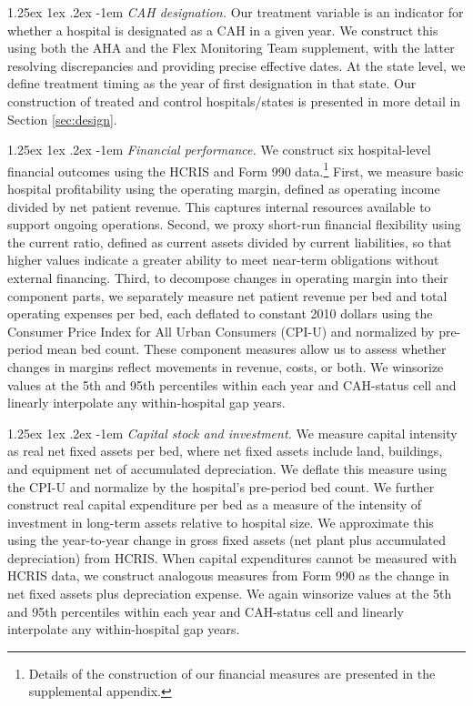 \documentclass[a4paper, 12pt, twoside]{article}
\makeatletter
\renewcommand\paragraph{\@startsection{paragraph}{4}{\z@}%
   {1.25ex \@plus 1ex \@minus .2ex}%
   {-1em}%
   {\normalfont\itshape}}
\makeatother
\begin{document}
\paragraph{\textit{CAH designation.}}  
Our treatment variable is an indicator for whether a hospital is designated as a CAH in a given year. We construct this using both the AHA and the Flex Monitoring Team supplement, with the latter resolving discrepancies and providing precise effective dates. At the state level, we define treatment timing as the year of first designation in that state. Our construction of treated and control hospitals/states is presented in more detail in Section \ref{sec:design}.

\paragraph{\textit{Financial performance.}}
We construct six hospital-level financial outcomes using the HCRIS and Form 990 data.\footnote{Details of the construction of our financial measures are presented in the supplemental appendix.} First, we measure basic hospital profitability using the operating margin, defined as operating income divided by net patient revenue. This captures internal resources available to support ongoing operations. Second, we proxy short-run financial flexibility using the current ratio, defined as current assets divided by current liabilities, so that higher values indicate a greater ability to meet near-term obligations without external financing. Third, to decompose changes in operating margin into their component parts, we separately measure net patient revenue per bed and total operating expenses per bed, each deflated to constant 2010 dollars using the Consumer Price Index for All Urban Consumers (CPI-U) and normalized by pre-period mean bed count. These component measures allow us to assess whether changes in margins reflect movements in revenue, costs, or both. We winsorize values at the 5th and 95th percentiles within each year and CAH-status cell and linearly interpolate any within-hospital gap years.

\paragraph{\textit{Capital stock and investment.}}
We measure capital intensity as real net fixed assets per bed, where net fixed assets include land, buildings, and equipment net of accumulated depreciation. We deflate this measure using the CPI-U and normalize by the hospital's pre-period bed count. We further construct real capital expenditure per bed as a measure of the intensity of investment in long-term assets relative to hospital size. We approximate this using the year-to-year change in gross fixed assets (net plant plus accumulated depreciation) from HCRIS. When capital expenditures cannot be measured with HCRIS data, we construct analogous measures from Form 990 as the change in net fixed assets plus depreciation expense. We again winsorize values at the 5th and 95th percentiles within each year and CAH-status cell and linearly interpolate any within-hospital gap years.
\end{document}
